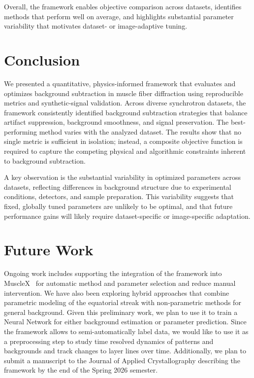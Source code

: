 \documentclass[iucr]{iucrjournals}
\begin{document}
Overall, the framework enables objective comparison across datasets, identifies methods that perform well on average, and highlights substantial parameter variability that motivates dataset- or image-adaptive tuning.




\section{Conclusion} 


We presented a quantitative, physics-informed framework that evaluates and optimizes background subtraction in muscle fiber diffraction using reproducible metrics and synthetic-signal validation. Across diverse synchrotron datasets, the framework consistently identified background subtraction strategies that balance artifact suppression, background smoothness, and signal preservation. The best-performing method varies with the analyzed dataset. The results show that no single metric is sufficient in isolation; instead, a composite objective function is required to capture the competing physical and algorithmic constraints inherent to background subtraction. 

A key observation is the substantial variability in optimized parameters across datasets, reflecting differences in background structure due to experimental conditions, detectors, and sample preparation. This variability suggests that fixed, globally tuned parameters are unlikely to be optimal, and that future performance gains will likely require dataset-specific or image-specific adaptation.


\section{Future Work}


Ongoing work includes supporting the integration of the framework into MuscleX~\cite{JiratrakanvongEtAl2024,madhurapantula2026musclexdi} for automatic method and parameter selection and reduce manual intervention. We have also been exploring hybrid approaches that combine parametric modeling of the equatorial streak with non-parametric methods for general background. Given this preliminary work, we plan to use it to train a Neural Network for either background estimation or parameter prediction. Since the framework allows to semi-automatically label data, we would like to use it as a preprocessing step to study time resolved dynamics of patterns and backgrounds and track changes to layer lines over time. Additionally, we plan to submit a manuscript to the Journal of Applied Crystallography describing the framework by the end of the Spring 2026 semester.
\end{document}
